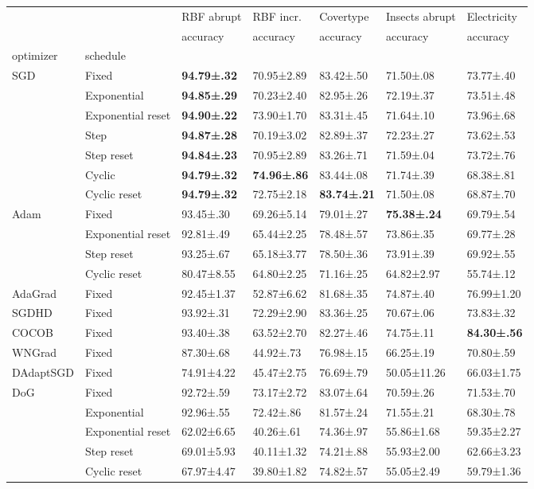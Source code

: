 \begin{tabular}{lllllll}
\toprule
 &  & RBF abrupt & RBF incr. & Covertype & Insects abrupt & Electricity \\
 &  & accuracy & accuracy & accuracy & accuracy & accuracy \\
optimizer & schedule &  &  &  &  &  \\
\midrule
\multirow[c]{7}{*}{SGD} & Fixed & \bfseries 94.79±.32 & 70.95±2.89 & 83.42±.50 & 71.50±.08 & 73.77±.40 \\
 & Exponential & \bfseries 94.85±.29 & 70.23±2.40 & 82.95±.26 & 72.19±.37 & 73.51±.48 \\
 & Exponential reset & \bfseries 94.90±.22 & 73.90±1.70 & 83.31±.45 & 71.64±.10 & 73.96±.68 \\
 & Step & \bfseries 94.87±.28 & 70.19±3.02 & 82.89±.37 & 72.23±.27 & 73.62±.53 \\
 & Step reset & \bfseries 94.84±.23 & 70.95±2.89 & 83.26±.71 & 71.59±.04 & 73.72±.76 \\
 & Cyclic & \bfseries 94.79±.32 & \bfseries 74.96±.86 & 83.44±.08 & 71.74±.39 & 68.38±.81 \\
 & Cyclic reset & \bfseries 94.79±.32 & 72.75±2.18 & \bfseries 83.74±.21 & 71.50±.08 & 68.87±.70 \\
\multirow[c]{4}{*}{Adam} & Fixed & 93.45±.30 & 69.26±5.14 & 79.01±.27 & \bfseries 75.38±.24 & 69.79±.54 \\
 & Exponential reset & 92.81±.49 & 65.44±2.25 & 78.48±.57 & 73.86±.35 & 69.77±.28 \\
 & Step reset & 93.25±.67 & 65.18±3.77 & 78.50±.36 & 73.91±.39 & 69.92±.55 \\
 & Cyclic reset & 80.47±8.55 & 64.80±2.25 & 71.16±.25 & 64.82±2.97 & 55.74±.12 \\
AdaGrad & Fixed & 92.45±1.37 & 52.87±6.62 & 81.68±.35 & 74.87±.40 & 76.99±1.20 \\
SGDHD & Fixed & 93.92±.31 & 72.29±2.90 & 83.36±.25 & 70.67±.06 & 73.83±.32 \\
COCOB & Fixed & 93.40±.38 & 63.52±2.70 & 82.27±.46 & 74.75±.11 & \bfseries 84.30±.56 \\
WNGrad & Fixed & 87.30±.68 & 44.92±.73 & 76.98±.15 & 66.25±.19 & 70.80±.59 \\
DAdaptSGD & Fixed & 74.91±4.22 & 45.47±2.75 & 76.69±.79 & 50.05±11.26 & 66.03±1.75 \\
\multirow[c]{5}{*}{DoG} & Fixed & 92.72±.59 & 73.17±2.72 & 83.07±.64 & 70.59±.26 & 71.53±.70 \\
 & Exponential & 92.96±.55 & 72.42±.86 & 81.57±.24 & 71.55±.21 & 68.30±.78 \\
 & Exponential reset & 62.02±6.65 & 40.26±.61 & 74.36±.97 & 55.86±1.68 & 59.35±2.27 \\
 & Step reset & 69.01±5.93 & 40.11±1.32 & 74.21±.88 & 55.93±2.00 & 62.66±3.23 \\
 & Cyclic reset & 67.97±4.47 & 39.80±1.82 & 74.82±.57 & 55.05±2.49 & 59.79±1.36 \\
\bottomrule
\end{tabular}

